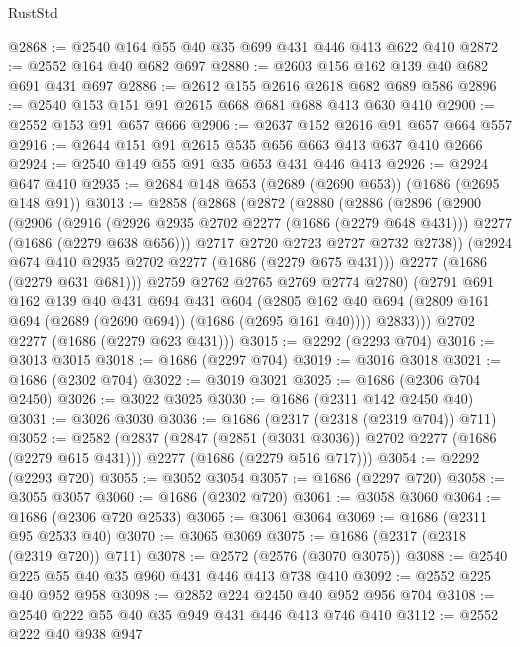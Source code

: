 \begin{lexlean}{RustStd}
\begin{coremodule}
@2868 := @2540 @164 @55 @40 @35 @699 @431 @446 @413 @622 @410
@2872 := @2552 @164 @40 @682 @697
@2880 := @2603 @156 @162 @139 @40 @682 @691 @431 @697
@2886 := @2612 @155 @2616 @2618 @682 @689 @586
@2896 := @2540 @153 @151 @91 @2615 @668 @681 @688 @413 @630 @410
@2900 := @2552 @153 @91 @657 @666
@2906 := @2637 @152 @2616 @91 @657 @664 @557
@2916 := @2644 @151 @91 @2615 @535 @656 @663 @413 @637 @410 @2666
@2924 := @2540 @149 @55 @91 @35 @653 @431 @446 @413
@2926 := @2924 @647 @410
@2935 := @2684 @148 @653 (@2689 (@2690 @653)) (@1686 (@2695 @148 @91))
@3013 := @2858
    (@2868
      (@2872
        (@2880
          (@2886
            (@2896
              (@2900
                (@2906
                  (@2916
                    (@2926 @2935 @2702 @2277 (@1686 (@2279 @648 @431)))
                    @2277
                    (@1686 (@2279 @638 @656)))
                  @2717
                  @2720
                  @2723
                  @2727
                  @2732
                  @2738))
              (@2924 @674 @410 @2935 @2702 @2277 (@1686 (@2279 @675 @431)))
              @2277
              (@1686 (@2279 @631 @681)))
            @2759
            @2762
            @2765
            @2769
            @2774
            @2780)
          (@2791
            @691
            @162
            @139
            @40
            @431
            @694
            @431
            @604
            (@2805 @162 @40 @694 (@2809 @161 @694 (@2689 (@2690 @694)) (@1686 (@2695 @161 @40))))
            @2833)))
      @2702
      @2277
      (@1686 (@2279 @623 @431)))
@3015 := @2292 (@2293 @704)
@3016 := @3013 @3015
@3018 := @1686 (@2297 @704)
@3019 := @3016 @3018
@3021 := @1686 (@2302 @704)
@3022 := @3019 @3021
@3025 := @1686 (@2306 @704 @2450)
@3026 := @3022 @3025
@3030 := @1686 (@2311 @142 @2450 @40)
@3031 := @3026 @3030
@3036 := @1686 (@2317 (@2318 (@2319 @704)) @711)
@3052 := @2582
    (@2837
      (@2847 (@2851 (@3031 @3036)) @2702 @2277 (@1686 (@2279 @615 @431)))
      @2277
      (@1686 (@2279 @516 @717)))
@3054 := @2292 (@2293 @720)
@3055 := @3052 @3054
@3057 := @1686 (@2297 @720)
@3058 := @3055 @3057
@3060 := @1686 (@2302 @720)
@3061 := @3058 @3060
@3064 := @1686 (@2306 @720 @2533)
@3065 := @3061 @3064
@3069 := @1686 (@2311 @95 @2533 @40)
@3070 := @3065 @3069
@3075 := @1686 (@2317 (@2318 (@2319 @720)) @711)
@3078 := @2572 (@2576 (@3070 @3075))
@3088 := @2540 @225 @55 @40 @35 @960 @431 @446 @413 @738 @410
@3092 := @2552 @225 @40 @952 @958
@3098 := @2852 @224 @2450 @40 @952 @956 @704
@3108 := @2540 @222 @55 @40 @35 @949 @431 @446 @413 @746 @410
@3112 := @2552 @222 @40 @938 @947

\end{coremodule}
\end{lexlean}
